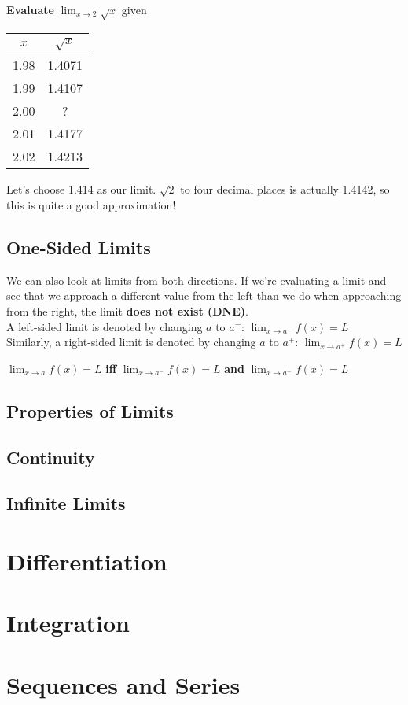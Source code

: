 \documentclass[oneside]{article}
\begin{document}
\textbf{Evaluate} $\lim_{x \to 2} \sqrt{x}$ given \hspace{1em} 
\begin{tabular}{c | c}
	$x$ & $\sqrt{x}$  \\ \hline
	1.98 & 1.4071 \\
	1.99 & 1.4107 \\
	2.00 & ?      \\
	2.01 & 1.4177 \\
	2.02 & 1.4213 \\
\end{tabular}

Let's choose 1.414 as our limit. $\sqrt{2}$ to four decimal places is actually 1.4142, so this is quite a good approximation!

\subsection{One-Sided Limits}
We can also look at limits from both directions. If we're evaluating a limit and see that we approach a different value from the left than we do when approaching from the right, the limit \textbf{does not exist (DNE)}. \\

A left-sided limit is denoted by changing $a$ to $a^-$: $\lim_{x \to a^-} f(x) = L$ \\

Similarly, a right-sided limit is denoted by changing $a$ to $a^+$: $\lim_{x \to a^+} f(x) = L$ \\

\begin{center}
	\begin{framed}
	$\lim_{x \to a} f(x) = L$ \textbf{iff} $\lim_{x \to a^-} f(x) = L$ \textbf{and} $\lim_{x \to a^+} f(x) = L$
	\end{framed}
\end{center}

\subsection{Properties of Limits}

\subsection{Continuity}

\subsection{Infinite Limits}

\section{Differentiation}

\section{Integration}

\section{Sequences and Series}
\end{document}

